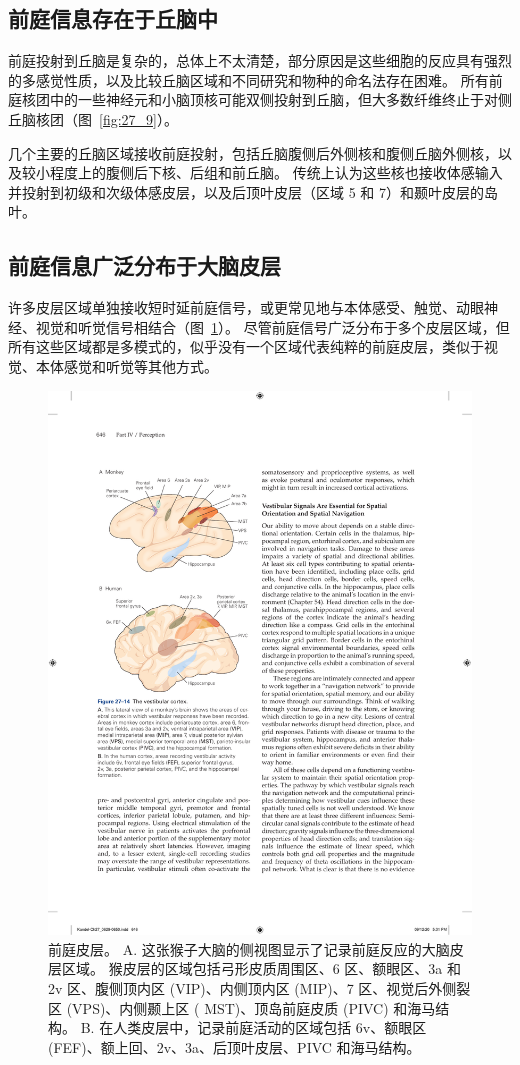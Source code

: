 \subsection{前庭信息存在于丘脑中}

前庭投射到丘脑是复杂的，总体上不太清楚，部分原因是这些细胞的反应具有强烈的多感觉性质，以及比较丘脑区域和不同研究和物种的命名法存在困难。
所有前庭核团中的一些神经元和小脑顶核可能双侧投射到丘脑，但大多数纤维终止于对侧丘脑核团（图~\ref{fig:27_9}）。


几个主要的丘脑区域接收前庭投射，包括丘脑腹侧后外侧核和腹侧丘脑外侧核，以及较小程度上的腹侧后下核、后组和前丘脑。
传统上认为这些核也接收体感输入并投射到初级和次级体感皮层，以及后顶叶皮层（区域 5 和 7）和颞叶皮层的岛叶。



\subsection{前庭信息广泛分布于大脑皮层}

许多皮层区域单独接收短时延前庭信号，或更常见地与本体感受、触觉、动眼神经、视觉和听觉信号相结合（图~\ref{fig:27_14}）。 
尽管前庭信号广泛分布于多个皮层区域，但所有这些区域都是多模式的，似乎没有一个区域代表纯粹的前庭皮层，类似于视觉、本体感觉和听觉等其他方式。


\begin{figure}[htbp]
	\centering
	\includegraphics[width=0.5\linewidth]{chap27/fig_27_14}
	\caption{前庭皮层。 A. 这张猴子大脑的侧视图显示了记录前庭反应的大脑皮层区域。 猴皮层的区域包括弓形皮质周围区、6 区、额眼区、3a 和 2v 区、腹侧顶内区 (VIP)、内侧顶内区 (MIP)、7 区、视觉后外侧裂区 (VPS)、内侧颞上区 ( MST)、顶岛前庭皮质 (PIVC) 和海马结构。 B. 在人类皮层中，记录前庭活动的区域包括 6v、额眼区 (FEF)、额上回、2v、3a、后顶叶皮层、PIVC 和海马结构。}
	\label{fig:27_14}
\end{figure}


